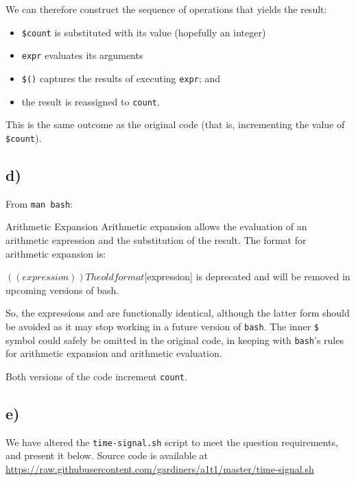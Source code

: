 \documentclass{article}
\begin{document}
We can therefore construct the sequence of operations that yields the result:
\begin{itemize}
\item \texttt{\$count} is substituted with its value (hopefully an integer)
\item \texttt{expr} evaluates its arguments
\item \texttt{\$()} captures the results of executing \texttt{expr}; and
\item the result is reassigned to \texttt{count}.
\end{itemize}

This is the same outcome as the original code (that is, incrementing the value of \texttt{\$count}).

\subsection{d)}

From \texttt{man bash}:

\begin{bashinline}
Arithmetic Expansion
    Arithmetic expansion allows the evaluation of an arithmetic expression and the substitution of the result.  The format for arithmetic expansion is:

        $((expression))

    The old format $[expression] is deprecated and will be removed in upcoming versions of bash.
\end{bashinline}

So, the expressions  and \bashsnippet{$[$count+1]} are functionally identical, although the latter form should be avoided as it may stop working in a future version of \texttt{bash}. The inner \texttt{\$} symbol could safely be omitted in the original code, in keeping with \texttt{bash}'s rules for arithmetic expansion and arithmetic evaluation.

Both versions of the code increment \texttt{count}.

\subsection{e)}

We have altered the \texttt{time-signal.sh} script to meet the question requirements, and present it below. Source code is available at \url{https://raw.githubusercontent.com/gardiners/a1t1/master/time-signal.sh}

\end{document}
